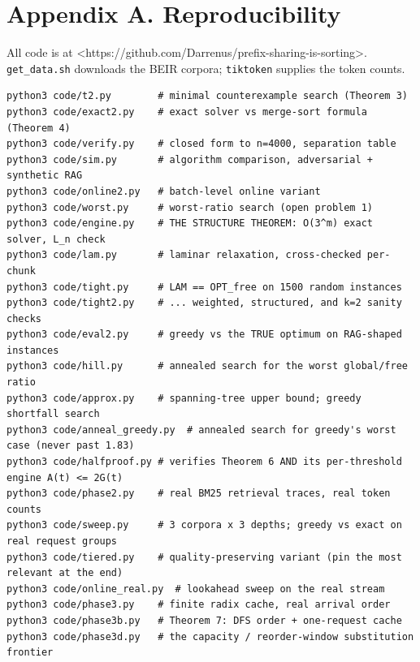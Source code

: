 \documentclass[11pt]{article}
\theoremstyle{plain}
\begin{document}
\section{Appendix A. Reproducibility}

All code is at <https://github.com/Darrenus/prefix-sharing-is-sorting>. \texttt{get\_data.sh} downloads the BEIR corpora; \texttt{tiktoken} supplies the token counts.

{\footnotesize\begin{verbatim}
python3 code/t2.py        # minimal counterexample search (Theorem 3)
python3 code/exact2.py    # exact solver vs merge-sort formula (Theorem 4)
python3 code/verify.py    # closed form to n=4000, separation table
python3 code/sim.py       # algorithm comparison, adversarial + synthetic RAG
python3 code/online2.py   # batch-level online variant
python3 code/worst.py     # worst-ratio search (open problem 1)
python3 code/engine.py    # THE STRUCTURE THEOREM: O(3^m) exact solver, L_n check
python3 code/lam.py       # laminar relaxation, cross-checked per-chunk
python3 code/tight.py     # LAM == OPT_free on 1500 random instances
python3 code/tight2.py    # ... weighted, structured, and k=2 sanity checks
python3 code/eval2.py     # greedy vs the TRUE optimum on RAG-shaped instances
python3 code/hill.py      # annealed search for the worst global/free ratio
python3 code/approx.py    # spanning-tree upper bound; greedy shortfall search
python3 code/anneal_greedy.py  # annealed search for greedy's worst case (never past 1.83)
python3 code/halfproof.py # verifies Theorem 6 AND its per-threshold engine A(t) <= 2G(t)
python3 code/phase2.py    # real BM25 retrieval traces, real token counts
python3 code/sweep.py     # 3 corpora x 3 depths; greedy vs exact on real request groups
python3 code/tiered.py    # quality-preserving variant (pin the most relevant at the end)
python3 code/online_real.py  # lookahead sweep on the real stream
python3 code/phase3.py    # finite radix cache, real arrival order
python3 code/phase3b.py   # Theorem 7: DFS order + one-request cache
python3 code/phase3d.py   # the capacity / reorder-window substitution frontier
\end{verbatim}}
\end{document}
